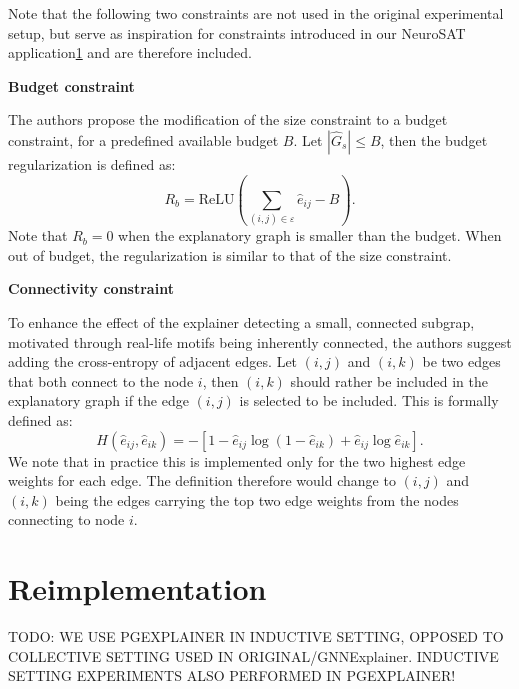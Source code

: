Note that the following two constraints are not used in the original experimental setup, but serve as inspiration for constraints introduced in our NeuroSAT application\ref{} and are therefore included. \bigskip

\textbf{Budget constraint}

The authors propose the modification of the size constraint to a budget constraint, for a predefined available budget $B$. Let $|\hat{G}_s| \leq B$, then the budget regularization is defined as:
\begin{equation}
    R_b = \text{ReLU}(\sum_{(i,j)\in \varepsilon}\hat{e}_{ij}-B).
\end{equation}
Note that $R_b = 0$ when the explanatory graph is smaller than the budget. When out of budget, the regularization is similar to that of the size constraint. \bigskip

\textbf{Connectivity constraint}

To enhance the effect of the explainer detecting a small, connected subgrap, motivated through real-life motifs being inherently connected, the authors suggest adding the cross-entropy of adjacent edges. Let $(i,j)$ and $(i,k)$ be two edges that both connect to the node $i$, then $(i,k)$ should rather be included in the explanatory graph if the edge $(i,j)$ is selected to be included. This is formally defined as:
\begin{equation}
    H(\hat{e}_{ij},\hat{e}_{ik}) = -[1-\hat{e}_{ij}\log(1-\hat{e}_{ik})+\hat{e}_{ij}\log \hat{e}_{ik}].
\end{equation}
We note that in practice this is implemented only for the two highest edge weights for each edge. The definition therefore would change to $(i,j)$ and $(i,k)$ being the edges carrying the top two edge weights from the nodes connecting to node $i$.


\section{Reimplementation}
TODO: WE USE PGEXPLAINER IN INDUCTIVE SETTING, OPPOSED TO COLLECTIVE SETTING USED IN ORIGINAL/GNNExplainer. INDUCTIVE SETTING EXPERIMENTS ALSO PERFORMED IN PGEXPLAINER!


